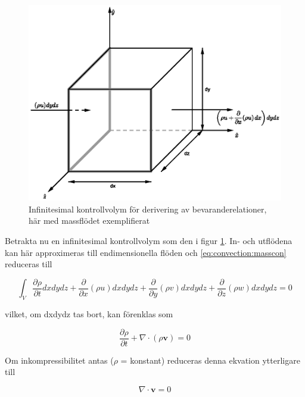 \begin{figure}[hpbt]
\centering
\includegraphics[scale=1]{images/massflowcube.eps}
\caption{\label{fig:massflowcube} Infinitesimal kontrollvolym för derivering av bevaranderelationer, här med massflödet exemplifierat}
\end{figure}

Betrakta nu en infinitesimal kontrollvolym som den i figur \ref{fig:massflowcube}. In- och utflödena kan här approximeras till endimensionella flöden och \eqref{eq:convection:masscon} reduceras till

\begin{equation}
\label{eq:convection:massconinf}
\int_V \frac{\partial \rho}{\partial t} dxdydz + \frac{\partial}{\partial x}\left( \rho u \right)dxdydz + \frac{\partial}{\partial y}\left( \rho v \right)dxdydz + \frac{\partial}{\partial z}\left( \rho w \right)dxdydz = 0
\end{equation}

vilket, om dxdydz tas bort, kan förenklas som

\begin{equation}
\label{eq:convection:continuity}
\frac{\partial \rho}{\partial t} + \nabla \cdot \left( \rho \mathbf{v} \right) = 0
\end{equation}

Om inkompressibilitet antas ($\rho$ = konstant) reduceras denna ekvation ytterligare till

\begin{equation}
\label{eq:convection:continuityinc}
\nabla \cdot \mathbf{v} = 0
\end{equation}

